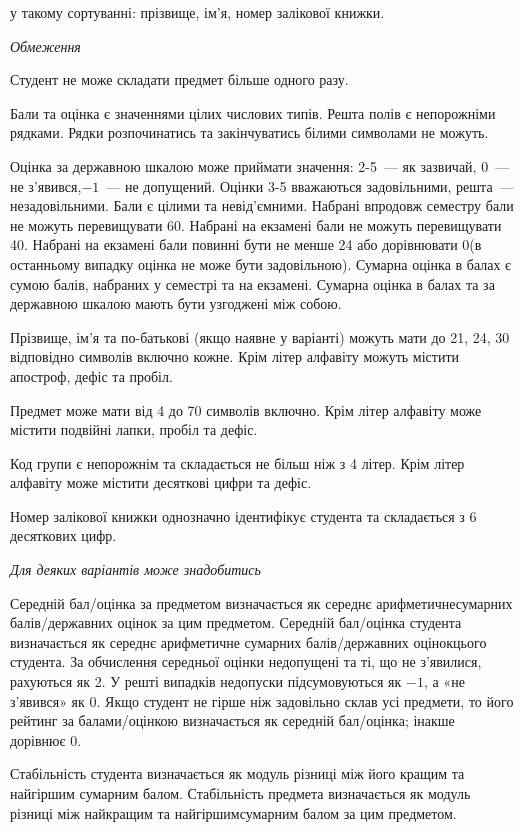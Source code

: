 \documentclass[11pt, ukrainian]{article}
\begin{document}
{\noindent}у такому сортуванні: прізвище, ім’я, номер залікової книжки.


\bigskip\textit{Обмеження}

Студент не може складати предмет більше одного разу.

Бали та оцінка є значеннями цілих числових типів. Решта полів є непорожніми рядками.
Рядки розпочинатись та закінчуватись білими символами не можуть.

Оцінка за державною шкалою може приймати значення: 2-5~--- як зазвичай, 0~--- не з’явився,$-1$~--- не допущений. 
Оцінки 3-5 вважаються задовільними, решта~--- незадовільними. 
Бали є цілими та невід’ємними.
Набрані впродовж семестру бали не можуть перевищувати 60. 
Набрані на екзамені бали не можуть перевищувати 40. 
Набрані на екзамені бали повинні бути не менше 24 або дорівнювати 0(в останньому випадку оцінка не може бути задовільною). 
Сумарна оцінка в балах є сумою балів, набраних у семестрі та на екзамені.
Сумарна оцінка в балах та за державною шкалою мають бути узгоджені між собою.

Прізвище, ім’я та по-батькові (якщо наявне у варіанті) можуть мати до 21, 24, 30 відповідно символів включно кожне. 
Крім літер алфавіту можуть містити апостроф, дефіс та пробіл.

Предмет може мати від 4 до 70 символів включно. 
Крім літер алфавіту може містити подвійні лапки, пробіл та дефіс.

Код групи є непорожнім та складається не більш ніж з 4 літер. 
Крім літер алфавіту може містити десяткові цифри та дефіс.


Номер залікової книжки однозначно ідентифікує студента та складається з 6 десяткових цифр. 

\bigskip\textit{Для деяких варіантів може знадобитись}

Середній бал/оцінка за предметом визначається як середнє арифметичнесумарних балів/державних оцінок за цим предметом. 
Середній бал/оцінка студента визначається як середнє арифметичне сумарних балів/державних оцінокцього студента. 
За обчислення середньої оцінки недопущені та ті, що не з’явилися, рахуються як 2.
У решті випадків недопуски підсумовуються як $-1$, а «не з’явився» як 0.
Якщо студент не гірше ніж задовільно склав усі предмети, 
то його рейтинг за балами/оцінкою визначається як середній бал/оцінка; інакше дорівнює 0.

Стабільність студента визначається як модуль різниці між його кращим та найгіршим сумарним балом.
Стабільність предмета визначається як модуль різниці між найкращим та найгіршимсумарним балом за цим предметом.
\end{document}
